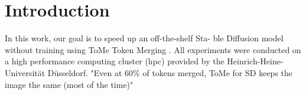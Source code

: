 \section{Introduction}
In this work, our goal is to speed up an off-the-shelf Sta-
ble Diffusion model without training using ToMe
Token Merging \cite{bolya2023tomesd}.
All experiments were conducted on a high performance computing cluster (hpc) provided by the Heinrich-Heine-Universität Düsseldorf.
"Even at 60\% of tokens merged, ToMe for SD keeps the image the same (most of the time)"